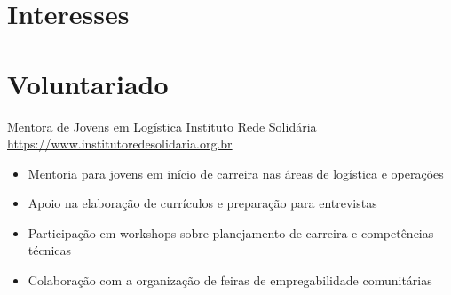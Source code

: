 \documentclass[a4paper, serif, 10pt]{moderncv}
\begin{document}
\section{Interesses}

\section{Voluntariado}

        {Mentora de Jovens em Logística}
        {Instituto Rede Solidária}
        {\url{https://www.institutoredesolidaria.org.br}}
        {}
        {\begin{itemize}
\item Mentoria para jovens em início de carreira nas áreas de logística e operações
\item Apoio na elaboração de currículos e preparação para entrevistas
\item Participação em workshops sobre planejamento de carreira e competências técnicas
\item Colaboração com a organização de feiras de empregabilidade comunitárias
\end{itemize}}
    
\end{document}
